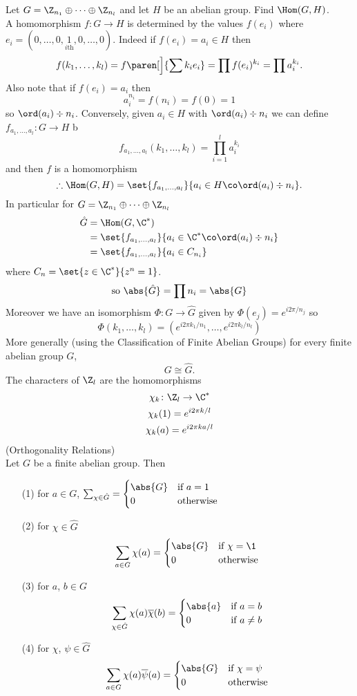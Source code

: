 \eg Let $G=\Z_{n_1}\oplus\dotsb\oplus\Z_{n_l}$ and let $H$ be an abelian group.  Find $\Hom(G,H)$. \\
\soln A homomorphism $f\colon G\to H$ is determined by the values $f(e_i)$ where $e_i=(0,\dotsc,0,\underset{\text{$i$th}}{1},0,\dotsc,0)$.  Indeed if $f(e_i)=a_i\in H$ then
\[ f(k_1,\dotsc,k_l) = f\paren[\Big]{\sum k_ie_i} = \prod f(e_i)^{k_i} = \prod a_i^{k_i} . \]
Also note that if $f(e_i)=a_i$ then
\[ a_i^{n_i} = f(n_i) = f(0) = 1 \]
so $\ord(a_i)\div n_i$.
Conversely, given $a_i\in H$ with $\ord(a_i)\div n_i$ we can define $f_{a_1,\dotsc,a_l}\colon G\to H$ b
\[ f_{a_1,\dotsc,a_l}(k_1,\dotsc,k_l) = \prod_{i=1}^l a_i^{k_i} \]
and then $f$ is a homomorphism
\[ \therefore \Hom(G,H) = \set{f_{a_1,\dotsc,a_l}}{a_i\in H\co\ord(a_i)\div n_i} . \]
In particular for $G=\Z_{n_1}\oplus\dotsb\oplus\Z_{n_l}$
\begin{align*}
\hat G &= \Hom(G,\C^*) \\
&= \set{f_{a_1,\dotsc,a_l}}{a_i\in\C^*\co\ord(a_i)\div n_i} \\
&= \set{f_{a_1,\dotsc,a_l}}{a_i\in C_{n_i}}
\end{align*}
where $C_n=\set{z\in\C^*}{z^n=1}$.
\[ \text{so } \abs{\hat G} = \prod n_i = \abs{G} \]
Moreover we have an isomorphism $\Phi\colon G\to\hat G$ given by $\Phi(e_j)=e^{i2\pi/n_j}$ so
\[ \Phi(k_1,\dotsc,k_l) = (e^{i2\pi k_1/n_1},\dotsc,e^{i2\pi k_l/n_l}) \]
More generally (using the Classification of Finite Abelian Groups) for every finite abelian group $G$,
\[ G \cong \hat G . \]
\eg The characters of $\Z_l$ are the homomorphisms
\begin{gather*}
\chi_k\colon \Z_l \to \C^* \\
\chi_k(1) = e^{i2\pi k/l} \\
\chi_k(a) = e^{i2\pi ka/l}
\end{gather*}
\thm (Orthogonality Relations) \\
Let $G$ be a finite abelian group.  Then
\begin{enumerate}
\item[(1)] for $a\in G$, $\sum_{\chi\in\hat G}=\begin{cases}
\abs{G} & \text{if $a=1$} \\
0 & \text{otherwise}
\end{cases}$
\item[(2)] for $\chi\in\hat G$
\[ \sum_{a\in G}\chi(a) = \begin{cases}
\abs{G} & \text{if $\chi=\1$} \\
0 & \text{otherwise}
\end{cases} \]
\item[(3)] for $a$, $b\in G$
\[ \sum_{\chi\in\hat G}\chi(a)\overline{\chi}(b) = \begin{cases}
\abs{a} & \text{if $a=b$} \\
0 & \text{if $a\neq b$}
\end{cases} \]
\item[(4)] for $\chi$, $\psi\in\hat G$
\[ \sum_{a\in G}\chi(a)\overline{\psi}(a) = \begin{cases}
\abs{G} & \text{if $\chi=\psi$} \\
0 & \text{otherwise}
\end{cases} \]
\end{enumerate}
